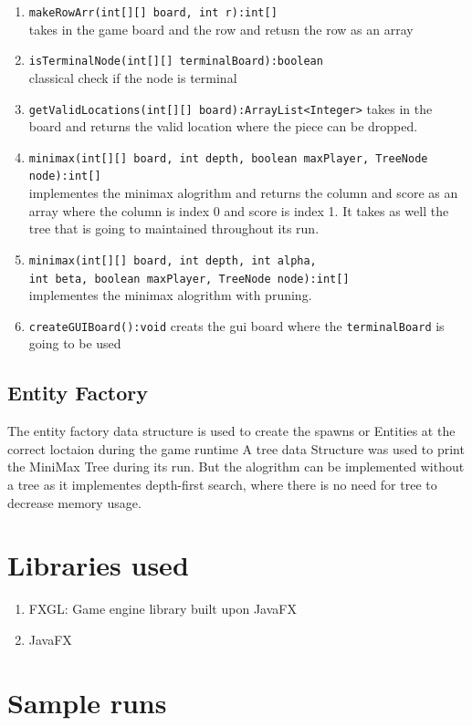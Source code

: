 \documentclass{article}
\begin{document}
\begin{enumerate}
    \item {\small\verb"makeRowArr(int[][] board, int r):int[]"}\\ takes in the game board and the row and retusn the row as an array
    \item {\small\verb"isTerminalNode(int[][] terminalBoard):boolean"}\\classical check if the node is terminal
    \item {\small\verb"getValidLocations(int[][] board):ArrayList<Integer>"} takes in the board and returns the valid location where the piece can be dropped.
    \item {\footnotesize\verb"minimax(int[][] board, int depth, boolean maxPlayer, TreeNode node):int[]"}\\ implementes the minimax alogrithm and returns the column and score as an array where the column is index 0 and score is index 1. It takes as well the tree that is going to maintained throughout its run.
    \item {\small\texttt{minimax(int[][] board, int depth, int alpha,\\ int beta, boolean maxPlayer, TreeNode node):int[]}}\\implementes the minimax alogrithm with pruning.
    \item \verb"createGUIBoard():void" creats the gui board where the \verb"terminalBoard" is going to be used
\end{enumerate}
\subsection{Entity Factory}
The entity factory data structure is used to create the spawns or Entities at the correct loctaion during the game runtime
A tree data Structure was used to print the MiniMax Tree during its run. But the alogrithm can be implemented without a tree as it implementes depth-first search, where there is no need for tree to decrease memory usage.
\section{Libraries used}
\begin{enumerate}
    \item FXGL: Game engine library built upon JavaFX
    \item JavaFX
\end{enumerate}
\section{Sample runs}
\end{document}
